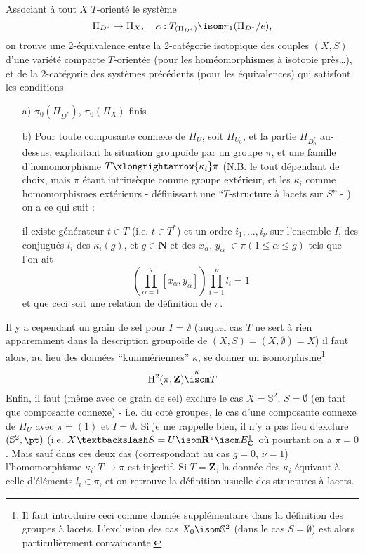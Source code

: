 Associant à tout $X$ $T$-orienté le système
$$
\Pi_{D^*} \to \Pi_X, \quad \kappa: T_{(\Pi_{D^*})} \isom \pi_1(\Pi_{D^*}/e),
$$
on trouve une 2-équivalence entre la 2-catégorie isotopique des couples $(X, S)$ d'une variété compacte $T$-orientée (pour les homéomorphismes à isotopie près\dots), et de la 2-catégorie des systèmes précédents (pour les équivalences) qui satisfont les conditions
\begin{enumerate}
    \item[a)] $\pi_0(\Pi_{D^*})$, $\pi_0(\Pi_X)$ finis
    \item[b)] Pour toute composante connexe de $\Pi_U$, soit $\Pi_{U_0}$, et la partie $\Pi_{D^*_0}$ au-dessus, explicitant la situation groupoïde par un groupe $\pi$, et une famille d'homomorphisme $T \xlongrightarrow{\kappa_i} \pi$ (N.B. le tout dépendant de choix, mais $\pi$ étant intrinsèque comme groupe extérieur, et les $\kappa_i$ comme homomorphismes extérieurs - définissant une ``$T$-structure à lacets sur $S$'' - ) on a ce qui suit :
    
    il existe générateur $t \in T$ (i.e. $t \in T^*$) et un ordre $i_1, \dots , i_\nu$ sur l'ensemble $I$, des conjugués $l_i$ des $\kappa_i (g)$, et $g \in \mathbf{N}$ et des $x_\alpha$, $y_\alpha$ $\in \pi (1 \leq \alpha \leq g)$ tels que l'on ait
    $$
    (\prod^g_{\alpha = 1} [ x_\alpha, y_\alpha ]) \prod^\nu_{i = 1} l_i = 1
    $$
    et que ceci soit une relation de définition de $\pi$.
\end{enumerate}
Il y a cependant un grain de sel pour $I = \emptyset$ (auquel cas $T$ ne sert à rien apparemment dans la description groupoïde de $(X, S) = (X, \emptyset) = X$) il faut alors, au lieu des données ``kummériennes'' $\kappa$, se donner un isomorphisme\footnote{Il faut introduire ceci comme donnée supplémentaire dans la définition des groupes à lacets. L'exclusion des cas $X_0 \isom \mathbb{S}^2$ (dans le cas $S = \emptyset$) est alors particulièrement convaincante.}
$$
\mathrm{H}^2 (\pi, \mathbf{Z}) \overset{\kappa}{\isom} T
$$
Enfin, il faut (même avec ce grain de sel) exclure le cas $X = \mathbb{S}^2$, $S = \emptyset$ (en tant que composante connexe) - i.e. du coté groupes, le cas d'une composante connexe de $\Pi_U$ avec $\pi = (1)$ et $I = \emptyset$. Si je me rappelle bien, il n'y a pas lieu d'exclure $(\mathbb{S}^2, \pt)$ (i.e. $X \textbackslash S = U \isom \mathbf{R}^2 \isom E^1_{\mathbf{C}}$ où pourtant on a $\pi = 0$. Mais sauf dans ces deux cas (correspondant au cas $g = 0$, $\nu = 1$) l'homomorphisme $\kappa_i: T \to \pi$ est injectif. Si $T = \mathbf{Z}$, la donnée des $\kappa_i$ équivaut à celle d'éléments $l_i \in \pi$, et on retrouve la définition usuelle des structures à lacets.

